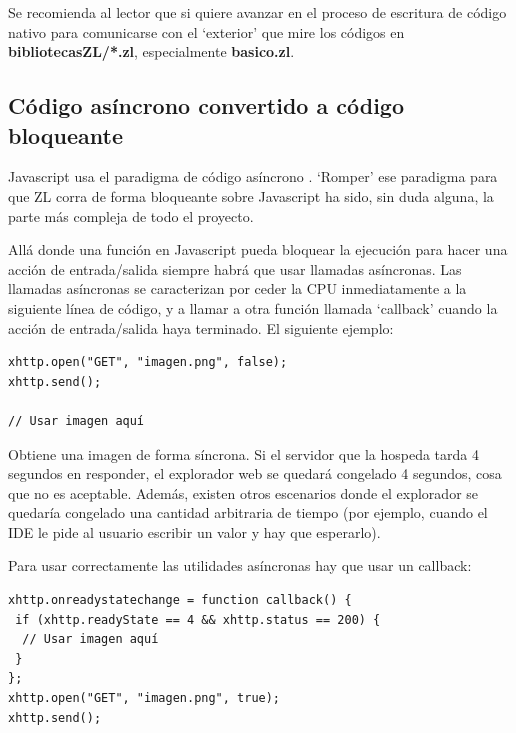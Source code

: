 \documentclass{report}
\begin{document}
	\vspace{10px}
	
	Se recomienda al lector que si quiere avanzar en el proceso de escritura de código nativo para comunicarse con el `exterior' que mire los códigos en \textbf{bibliotecasZL/*.zl}, especialmente \textbf{basico.zl}.
	
	\subsection{Código asíncrono convertido a código bloqueante}
	
	Javascript usa el paradigma de código asíncrono \cite{javascriptasync}. `Romper' ese paradigma para que ZL corra de forma bloqueante sobre Javascript ha sido, sin duda alguna, la parte más compleja de todo el proyecto. 
	
	\vspace{10px}

	Allá donde una función en Javascript pueda bloquear la ejecución para hacer una acción de entrada/salida siempre habrá que usar llamadas asíncronas. Las llamadas asíncronas se caracterizan por ceder la CPU inmediatamente a la siguiente línea de código, y a llamar a otra función llamada `callback' cuando la acción de entrada/salida haya terminado. El siguiente ejemplo:
	
\begin{BVerbatim}
xhttp.open("GET", "imagen.png", false);
xhttp.send();

// Usar imagen aquí

\end{BVerbatim}

	Obtiene una imagen de forma síncrona. Si el servidor que la hospeda tarda 4 segundos en responder, el explorador web se quedará congelado 4 segundos, cosa que no es aceptable. Además, existen otros escenarios donde el explorador se quedaría congelado una cantidad arbitraria de tiempo (por ejemplo, cuando el IDE le pide al usuario escribir un valor y hay que esperarlo).
	
	Para usar correctamente las utilidades asíncronas hay que usar un callback:


\begin{BVerbatim}
xhttp.onreadystatechange = function callback() {
 if (xhttp.readyState == 4 && xhttp.status == 200) {
  // Usar imagen aquí
 }
};
xhttp.open("GET", "imagen.png", true);
xhttp.send();
\end{BVerbatim}

	\vspace{10px}
\end{document}
